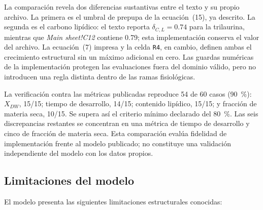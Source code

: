La comparación revela dos diferencias sustantivas entre el texto y su propio
archivo. La primera es el umbral de prepupa de la ecuación~(15), ya descrito.
La segunda es el carbono lipídico: el texto reporta $\delta_{C,L}=0.74$ para
la trilaurina, mientras que \emph{Main sheet!C12} contiene 0.79; esta
implementación conserva el valor del archivo. La ecuación~(7) impresa y la
celda \texttt{R4}, en cambio, definen ambas el crecimiento estructural sin un
máximo adicional en cero. Las guardas numéricas de la implementación protegen
las evaluaciones fuera del dominio válido, pero no introducen una regla
distinta dentro de las ramas fisiológicas.

La verificación contra las métricas publicadas reproduce 54 de 60 casos
(90~\%): $X_{DW}$, 15/15; tiempo de desarrollo, 14/15; contenido lipídico,
15/15; y fracción de materia seca, 10/15. Se supera así el criterio mínimo
declarado del 80~\%. Las seis discrepancias restantes se concentran en una
métrica de tiempo de desarrollo y cinco de fracción de materia seca. Esta
comparación evalúa fidelidad de implementación frente al modelo publicado; no
constituye una validación independiente del modelo con los datos propios.

\subsection{Limitaciones del modelo}
\label{sup:limitaciones}

El modelo presenta las siguientes limitaciones estructurales conocidas:

